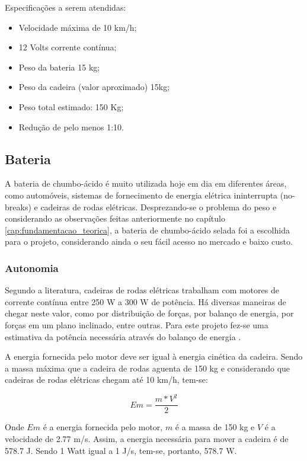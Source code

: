   Especificações a serem atendidas:

  \begin{itemize}
    \item Velocidade máxima de 10 km/h;
    \item 12 Volts corrente contínua;
    \item Peso da bateria 15 kg;
    \item Peso da cadeira (valor aproximado) 15kg;
    \item Peso total estimado: 150 Kg;
    \item Redução de pelo menos 1:10.
  \end{itemize}

  \subsection{Bateria}

  A bateria de chumbo-ácido é muito utilizada hoje em dia em diferentes áreas, como automóveis, sistemas de fornecimento de energia elétrica ininterrupta (no-breaks) e cadeiras de rodas elétricas. Desprezando-se o problema do peso e considerando as observações feitas anteriormente no capítulo \ref{cap:fundamentacao_teorica}, a bateria de chumbo-ácido selada foi a escolhida para o projeto, considerando ainda o seu fácil acesso no mercado e baixo custo.

  \subsubsection{Autonomia}

  Segundo a literatura, cadeiras de rodas elétricas trabalham com motores de corrente contínua entre 250 W a 300 W de potência. Há diversas maneiras de chegar neste valor, como por distribuição de forças, por balanço de energia, por forças em um plano inclinado, entre outras. Para este projeto fez-se uma estimativa da potência necessária através do balanço de energia \cite{acionamento_motores_cadeira}.

  A energia fornecida pelo motor deve ser igual à energia cinética da cadeira. Sendo a massa máxima que a cadeira de rodas aguenta de 150 kg e considerando que cadeiras de rodas elétricas chegam até 10 km/h, tem-se:


  \begin{equation}
    Em = \frac{m*V^2}{2}
  \end{equation}

  Onde $Em$ é a energia fornecida pelo motor, $m$ é a massa de 150 kg e $V$ é a velocidade de 2.77 m/s. Assim, a energia necessária para mover a cadeira é de 578.7 J. Sendo 1 Watt igual a 1 J/s, tem-se, portanto, 578.7 W.

